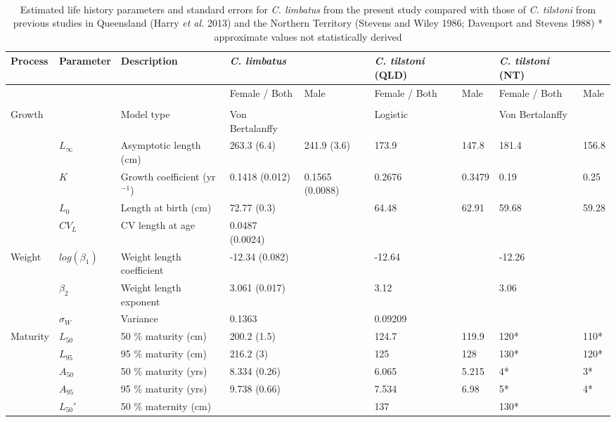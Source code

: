 \documentclass[]{article}
\begin{document}
\begin{landscape}
\
\
\begin{table}[ht]
\centering
\caption{Estimated life history parameters and standard errors for \textit{C. limbatus} 
                    from the present study compared with those of
                    \textit{C. tilstoni} from previous studies in Queensland (Harry \textit{et al.} 2013)
                    and the Northern Territory (Stevens and Wiley 1986; Davenport and Stevens 1988) * approximate values not statistically derived \newline} 
\begin{tabular}{lllllllll}
  \toprule
Process & Parameter & Description & \textit{C. limbatus} &   & \textit{C. tilstoni} (QLD) &      & \textit{C. tilstoni} (NT) &    \\ 
  \midrule
 &  &  & Female / Both & Male & Female / Both & Male & Female / Both & Male \\ 
   &  &  &  &  &  &  &  &  \\ 
  Growth &  & Model type & Von Bertalanffy &  & Logistic &  & Von Bertalanffy &  \\ 
   & $L_{\infty}$ & Asymptotic length (cm) & 263.3 (6.4) & 241.9 (3.6) & 173.9 & 147.8 & 181.4 & 156.8 \\ 
   & $K$ & Growth coefficient (yr$^{-1}$) & 0.1418 (0.012) & 0.1565 (0.0088) & 0.2676 & 0.3479 & 0.19 & 0.25 \\ 
   & $L_0$ & Length at birth (cm) & 72.77 (0.3) &  & 64.48 & 62.91 & 59.68 & 59.28 \\ 
   & $CV_L$ & CV length at age & 0.0487 (0.0024) &  &  &  &  &  \\ 
  Weight & $log(\beta_1)$ & Weight length coefficient & -12.34 (0.082) &  & -12.64 &  & -12.26 &  \\ 
   & $\beta_2$ & Weight length exponent & 3.061 (0.017) &  & 3.12 &  & 3.06 &  \\ 
   & $\sigma_W$ & Variance & 0.1363  &  & 0.09209 &  &  &  \\ 
  Maturity & $L_{50}$ & 50 $\%$ maturity (cm) & 200.2 (1.5) &  & 124.7 & 119.9 & 120* & 110* \\ 
   & $L_{95}$ & 95 $\%$ maturity (cm) & 216.2 (3) &  & 125 & 128 & 130* & 120* \\ 
   & $A_{50}$ & 50 $\%$ maturity (yrs) & 8.334 (0.26) &  & 6.065 & 5.215 & 4* & 3* \\ 
   & $A_{95}$ & 95  $\%$ maturity (yrs) & 9.738 (0.66) &  & 7.534 & 6.98 & 5* & 4* \\ 
   & $L_{50}\prime$ & 50 $\%$ maternity (cm) &  &  & 137 &  & 130* &  \\ 

\end{tabular}
\end{table}
\end{landscape}
\end{document}
